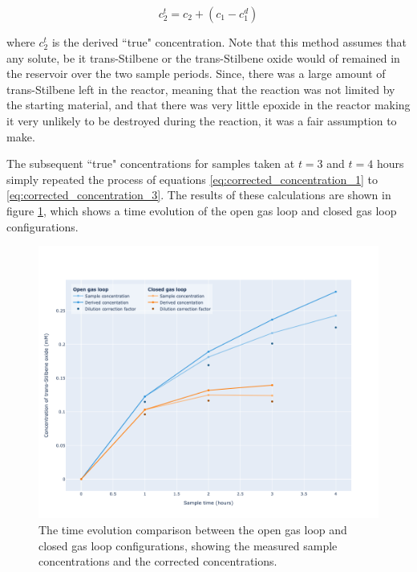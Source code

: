 \begin{equation}
    c_2^t = c_2 + (c_1 - c_1^d)
    \label{eq:corrected_concentration_3}
\end{equation}

where $c_2^t$ is the derived ``true" concentration. Note that this method assumes that any solute, be it trans-Stilbene or the trans-Stilbene oxide would of remained in the reservoir over the two sample periods. Since, there was a large amount of trans-Stilbene left in the reactor, meaning that the reaction was not limited by the starting material, and that there was very little epoxide in the reactor making it very unlikely to be destroyed during the reaction, it was a fair assumption to make.

The subsequent ``true" concentrations for samples taken at $t=3$ and $t=4$ hours  simply repeated the process of equations \ref{eq:corrected_concentration_1} to \ref{eq:corrected_concentration_3}. The results of these calculations are shown in figure \ref{fig:open_vs_closed_loop_time_evolution}, which shows a time evolution of the open gas loop and closed gas loop configurations. 

\begin{figure}[h!]
	\centering
    \includegraphics[width=\linewidth]{chapter_6/figures/open_vs_closed_loop_time_evolution.png} 
	\caption{The time evolution comparison between the open gas loop and closed gas loop configurations, showing the measured sample concentrations and the corrected concentrations.}
	\label{fig:open_vs_closed_loop_time_evolution}
\end{figure} 

